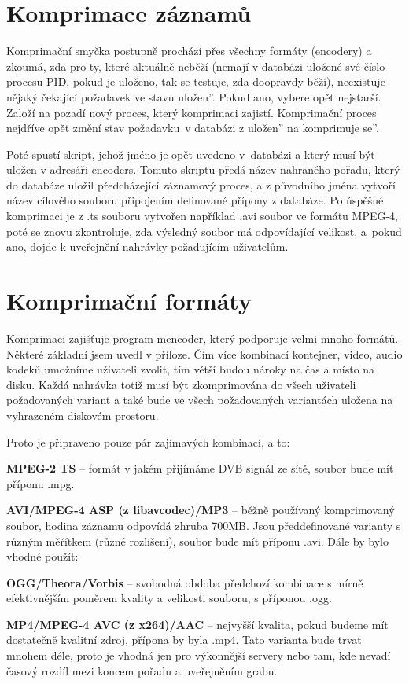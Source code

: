 \section{Komprimace záznamů}
Komprimační smyčka postupně prochází přes všechny formáty (encodery) a zkoumá, zda pro ty, které aktuálně neběží (nemají v databázi uložené své číslo procesu PID, pokud je uloženo, tak se testuje, zda doopravdy běží), neexistuje nějaký čekající požadavek ve stavu \quotedblbase uložen''. Pokud ano, vybere opět nejstarší. Založí na pozadí nový proces, který komprimaci zajistí. Komprimační proces nejdříve opět změní stav požadavku~v databázi z \quotedblbase uložen'' na \quotedblbase komprimuje se''.
 
Poté spustí skript, jehož jméno je opět uvedeno v~databázi a který musí být uložen v adresáři encoders. Tomuto skriptu předá název nahraného pořadu, který do databáze uložil předcházející záznamový proces, a z původního jména vytvoří název cílového souboru připojením definované přípony z databáze. Po úspěšné komprimaci je z .ts souboru vytvořen například .avi soubor ve formátu MPEG-4, poté se znovu zkontroluje, zda výsledný soubor má odpovídající velikost, a~pokud ano, dojde k uveřejnění nahrávky požadujícím uživatelům. 

\section{Komprimační formáty}
Komprimaci zajišťuje program mencoder, který podporuje velmi mnoho formátů. Některé základní jsem uvedl v příloze.
Čím více kombinací kontejner, video, audio kodeků umožníme uživateli zvolit, tím větší budou nároky na čas a místo na disku. Každá nahrávka totiž musí být zkomprimována do všech uživateli požadovaných variant a také bude ve všech požadovaných variantách uložena na vyhrazeném diskovém prostoru.

Proto je připraveno pouze pár zajímavých kombinací, a to:

\bitem
\item \textbf{MPEG-2 TS} -- formát v jakém přijímáme DVB signál ze sítě, soubor bude mít příponu .mpg.
\item \textbf{AVI/MPEG-4 ASP (z libavcodec)/MP3} -- běžně používaný komprimovaný soubor, hodina záznamu odpovídá zhruba 700MB. Jsou předdefinované varianty s různým měřítkem (různé rozlišení), soubor bude mít příponu .avi.
\eitem
Dále by bylo vhodné použít:
\bitem
\item \textbf{OGG/Theora/Vorbis} -- svobodná obdoba předchozí kombinace s mírně efektivnějším poměrem kvality a velikosti souboru, s příponou .ogg.
\item \textbf{MP4/MPEG-4 AVC (z x264)/AAC} -- nejvyšší kvalita, pokud budeme mít dostatečně kvalitní zdroj, přípona by byla .mp4. Tato varianta bude trvat mnohem déle, proto je vhodná jen pro výkonnější servery nebo tam, kde nevadí časový rozdíl mezi koncem pořadu a uveřejněním grabu.
\eitem
